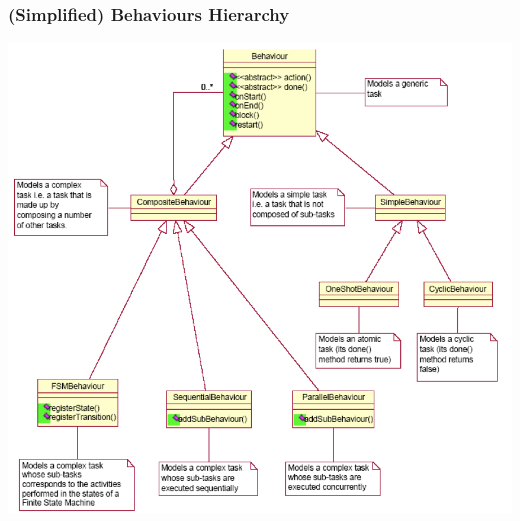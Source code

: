 \documentclass{beamer}\mode<presentation>{\usetheme{AMSCesenaPurpleAndGold}}
\begin{document}
\begin{frame}\frametitle{(Simplified) Behaviours Hierarchy}
    \begin{center}
        \includegraphics[width=.65\textwidth]{res/img/jade_behaviour_uml}
    \end{center}
\end{frame}
\end{document}
